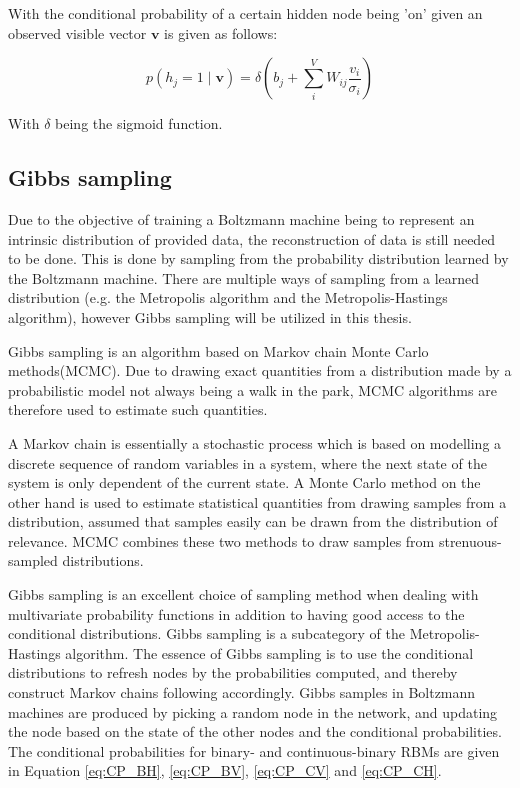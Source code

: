 \documentclass[../main.tex]{subfiles}
\begin{document}
With the conditional probability of a certain hidden node being 'on' given an observed visible vector $\mathbf{v}$ is given as follows:

\begin{equation}
p\left(h_{j}=1 \mid \mathbf{v}\right)=\delta\left(b_{j}+\sum_{i}^V W_{i j} \frac{v_{i}}{\sigma_{i}}\right)
\label{eq:CP_CH}
\end{equation}

With $\delta$ being the sigmoid function.

\subsection{Gibbs sampling}
Due to the objective of training a Boltzmann machine being to represent an intrinsic distribution of provided data, the reconstruction of data is still needed to be done. This is done by sampling from the probability distribution learned by the Boltzmann machine. There are multiple ways of sampling from a learned distribution (e.g. the Metropolis algorithm and the Metropolis-Hastings algorithm), however Gibbs sampling will be utilized in this thesis.

Gibbs sampling is an algorithm based on Markov chain Monte Carlo methods(MCMC). Due to drawing exact quantities from a distribution made by a probabilistic model not always being a walk in the park, MCMC algorithms are therefore used to estimate such quantities. 

A Markov chain is essentially a stochastic process which is based on modelling a discrete sequence of random variables in a system, where the next state of the system is only dependent of the current state\cite{article_rbm2}. A Monte Carlo method on the other hand is used to estimate statistical quantities from drawing samples from a distribution, assumed that samples easily can be drawn from the distribution of relevance. MCMC combines these two methods to draw samples from strenuous-sampled distributions.

Gibbs sampling is an excellent choice of sampling method when dealing with multivariate probability functions in addition to having good access to the conditional distributions. Gibbs sampling is a subcategory of the Metropolis-Hastings algorithm. The essence of Gibbs sampling is to use the conditional distributions to refresh nodes by the probabilities computed, and thereby construct Markov chains following accordingly. Gibbs samples in Boltzmann machines are produced by picking a random node in the network, and updating the node based on the state of the other nodes and the conditional probabilities. The conditional probabilities for binary- and continuous-binary RBMs are given in Equation \ref{eq:CP_BH}, \ref{eq:CP_BV}, \ref{eq:CP_CV} and \ref{eq:CP_CH}.
\end{document}
